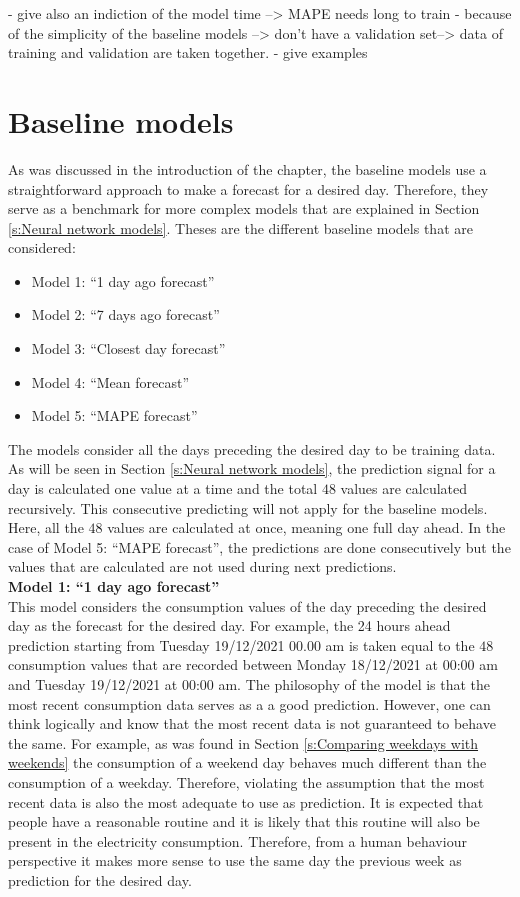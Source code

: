 - give also an indiction of the model time --> MAPE needs long to train
- because of the simplicity of the baseline models --> don't have a validation set--> data of training and validation are taken together. 
- give examples

\section{Baseline models}\label{s:Baseline models}
As was discussed in the introduction of the chapter, the baseline models use a straightforward approach to make a forecast for a desired day. Therefore, they serve as a benchmark for more complex models that are explained in Section \ref{s:Neural network models}. Theses are the different baseline models that are considered:

\begin{itemize}
	\item Model 1: ``1 day ago forecast''
	\item Model 2: ``7 days ago forecast''
	\item Model 3: ``Closest day forecast''
	\item Model 4: ``Mean forecast''
	\item Model 5: ``MAPE forecast''
\end{itemize} 

The models consider all the days preceding the desired day to be training data. As will be seen in Section \ref{s:Neural network models}, the prediction signal for a day is calculated one value at a time and the total $ 48 $ values are calculated recursively. This consecutive predicting will not apply for the baseline models. Here, all the $ 48 $ values are calculated at once, meaning one full day ahead. In the case of Model 5: ``MAPE forecast'', the predictions are done consecutively but the values that are calculated are not used during next predictions.\\


\textbf{Model 1: ``1 day ago forecast''}\\
This model considers the consumption values of the day preceding the desired day as the forecast for the desired day. For example, the 24 hours ahead prediction starting from Tuesday 19/12/2021 00.00 am is taken equal to the $ 48 $ consumption values that are recorded between Monday 18/12/2021 at 00:00 am and Tuesday 19/12/2021 at 00:00 am. The philosophy of the model is that the most recent consumption data serves as a a good prediction. However, one can think logically and know that the most recent data is not guaranteed to behave the same. For example, as was found in Section \ref{s:Comparing weekdays with weekends} the consumption of a weekend day behaves much different than the consumption of a weekday. Therefore, violating the assumption that the most recent data is also the most adequate to use as prediction. It is expected that people have a reasonable routine and it is likely that this routine will also be present in the electricity consumption. Therefore, from a human behaviour perspective it makes more sense to use the same day the previous week as prediction for the desired day.\\

